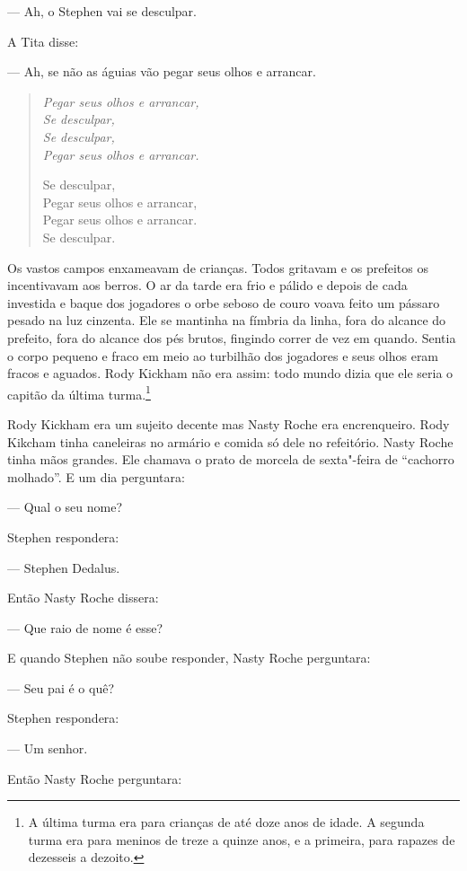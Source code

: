  --- Ah, o Stephen vai se desculpar.

A Tita disse:

 --- Ah, se não as águias vão pegar seus olhos e arrancar.


\begin{verse}\itshape
Pegar seus olhos e arrancar,\\
Se desculpar,\\
Se desculpar,\\
Pegar seus olhos e arrancar.

Se desculpar,\\
Pegar seus olhos e arrancar,\\
Pegar seus olhos e arrancar.\\
Se desculpar.
\end{verse}

Os vastos campos enxameavam de crianças. Todos gritavam e os prefeitos
os incentivavam aos berros. O ar da tarde era frio e pálido e depois de
cada investida e baque dos jogadores o orbe seboso de couro voava feito
um pássaro pesado na luz cinzenta. Ele se mantinha na fímbria da linha,
fora do alcance do prefeito, fora do alcance dos pés brutos, fingindo
correr de vez em quando. Sentia o corpo pequeno e fraco em meio ao
turbilhão dos jogadores e seus olhos eram fracos e aguados. Rody
Kickham não era assim: todo mundo dizia que ele seria o capitão da última turma.\footnote{ A
última turma era para crianças de até doze anos de idade. A segunda
turma era para meninos de treze a quinze anos, e a primeira, para rapazes de
dezesseis a dezoito.} 

Rody Kickham era um sujeito decente mas Nasty Roche era encrenqueiro.
Rody Kikcham tinha caneleiras no armário e comida só dele no
refeitório. Nasty Roche tinha mãos grandes. Ele chamava o prato de morcela de
sexta"-feira de “cachorro molhado”. E um dia perguntara:

 --- Qual o seu nome?

Stephen respondera:

 --- Stephen Dedalus.

Então Nasty Roche dissera:

 --- Que raio de nome é esse?

E quando Stephen não soube responder, Nasty Roche perguntara:

 --- Seu pai é o quê?

Stephen respondera:

 --- Um senhor.

Então Nasty Roche perguntara:

